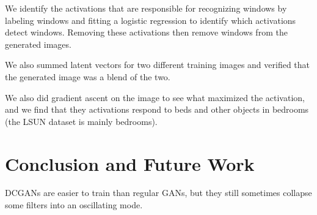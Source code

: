 \documentclass[a4paper]{article}
\begin{document}
We identify the activations that are responsible for recognizing windows by
labeling windows and fitting a logistic regression to identify which
activations detect windows. Removing these activations then remove windows
from the generated images.

We also summed latent vectors for two different training images and verified
that the generated image was a blend of the two.

We also did gradient ascent on the image to see what maximized the activation,
and we find that they activations respond to beds and other objects in
bedrooms (the LSUN dataset is mainly bedrooms).

\section{Conclusion and Future Work}
DCGANs are easier to train than regular GANs, but they still sometimes collapse
some filters into an oscillating mode.
\end{document}
